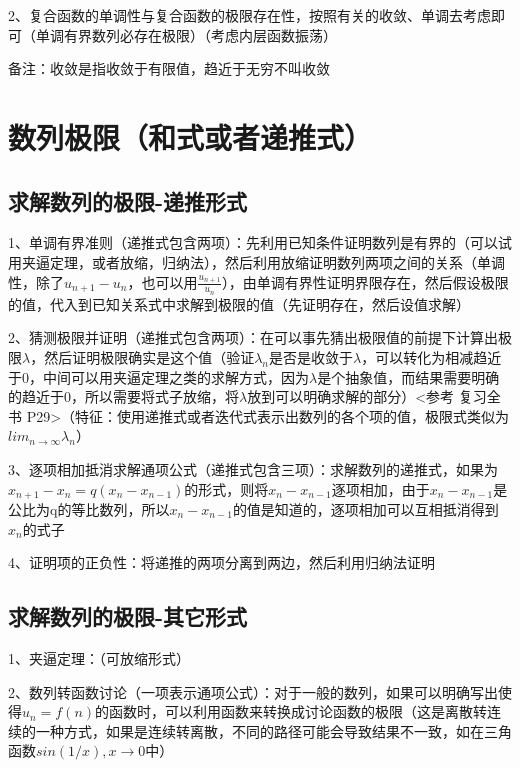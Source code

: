 2、复合函数的单调性与复合函数的极限存在性，按照有关的收敛、单调去考虑即可（单调有界数列必存在极限）（考虑内层函数振荡）

备注：收敛是指收敛于有限值，趋近于无穷不叫收敛

\section{数列极限（和式或者递推式）}



\subsection{求解数列的极限-递推形式}

1、单调有界准则（递推式包含两项）：先利用已知条件证明数列是有界的（可以试用夹逼定理，或者放缩，归纳法），然后利用放缩证明数列两项之间的关系（单调性，除了$u_{n+1}-u_{n}$，也可以用$\frac{u_{n+1}}{u_{n}}$），由单调有界性证明界限存在，然后假设极限的值，代入到已知关系式中求解到极限的值（先证明存在，然后设值求解）

2、猜测极限并证明（递推式包含两项）：在可以事先猜出极限值的前提下计算出极限$\lambda$，然后证明极限确实是这个值（验证$\lambda_n$是否是收敛于$\lambda$，可以转化为相减趋近于0，中间可以用夹逼定理之类的求解方式，因为$\lambda$是个抽象值，而结果需要明确的趋近于0，所以需要将式子放缩，将$\lambda$放到可以明确求解的部分）<参考 复习全书 P29>（特征：使用递推式或者迭代式表示出数列的各个项的值，极限式类似为$lim_{n \rightarrow \infty}\lambda_n$）

3、逐项相加抵消求解通项公式（递推式包含三项）：求解数列的递推式，如果为$x_{n+1}-x_{n}=q(x_{n}-x_{n-1})$的形式，则将$x_{n}-x_{n-1}$逐项相加，由于$x_{n}-x_{n-1}$是公比为q的等比数列，所以$x_{n}-x_{n-1}$的值是知道的，逐项相加可以互相抵消得到$x_{n}$的式子

4、证明项的正负性：将递推的两项分离到两边，然后利用归纳法证明



\subsection{求解数列的极限-其它形式}

1、夹逼定理：（可放缩形式）

2、数列转函数讨论（一项表示通项公式）：对于一般的数列，如果可以明确写出使得$u_{n}=f(n)$的函数时，可以利用函数来转换成讨论函数的极限（这是离散转连续的一种方式，如果是连续转离散，不同的路径可能会导致结果不一致，如在三角函数$sin(1/x),x \rightarrow 0$中）



